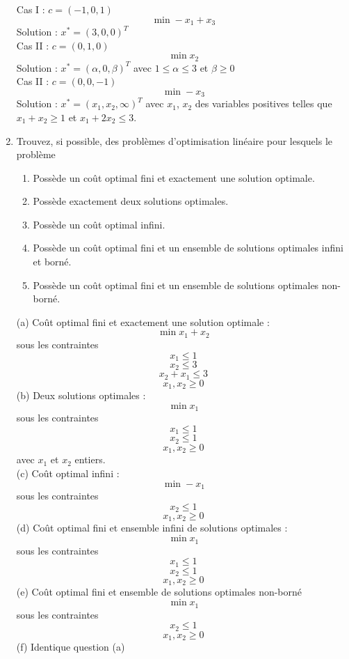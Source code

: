 \begin{enumerate}
    \begin{solution}
      Cas I : $c = (-1,0,1)$ \\
      $$ \min -x_{1} + x_{3}$$
      Solution : $x^{*} = (3,0,0)^{T}$\\
      \newline
      Cas II : $c = (0,1,0)$ \\
      $$ \min x_{2}$$
      Solution : $x^{*} = (\alpha,0,\beta)^{T}$ avec $ 1\le \alpha \le 3$ et $\beta \geq 0$\\
      \newline
      Cas II : $c = (0,0,-1)$ \\
      $$ \min -x_{3}$$
      Solution : $x^{*} = (x_{1},x_{2},\infty)^{T}$ avec $x_{1}$, $x_{2}$ des variables positives telles que $x_{1} + x_{2} \geq 1$ et $x_{1} + 2x_{2} \le 3$. 

    \end{solution}


  \item  Trouvez, si possible, des problèmes d'optimisation linéaire pour lesquels le problème

    \begin{enumerate}
      \item Poss\`ede un co\^ut optimal fini et exactement une solution optimale.
      \item Poss\`ede exactement deux solutions optimales.
      \item Possède un coût optimal infini.
      \item Possède un coût optimal fini et un ensemble de solutions optimales infini et borné.
      \item Possède un coût optimal fini et un ensemble de solutions  optimales non-borné.

    \end{enumerate}

    \begin{solution}
      (a) Coût optimal fini et exactement une solution optimale : 
      $$ \min x_{1} + x_{2}$$
      sous les contraintes 
      $$ x_{1} \le 1$$
      $$ x_{2} \le 3$$
      $$ x_{2} + x_{1} \le 3 $$
      $$ x_{1}, x_{2} \geq 0$$
      (b) Deux solutions optimales : 
      $$ \min x_{1}$$
      sous les contraintes
      $$ x_{1} \le 1$$
      $$ x_{2} \le 1$$
      $$ x_{1}, x_{2} \geq 0$$
      avec $x_{1}$ et $x_{2}$ entiers. \\
      \newline
      (c) Coût optimal infini : 
      $$ \min -x_{1} $$ 
      sous les contraintes
      $$ x_{2} \le 1 $$ 
      $$ x_{1}, x_{2} \geq 0$$
      (d) Coût optimal fini et ensemble infini de solutions optimales : 
      $$ \min x_{1}$$
      sous les contraintes
      $$ x_{1} \le 1$$
      $$ x_{2} \le 1$$
      $$ x_{1}, x_{2} \geq 0$$
      (e) Coût optimal fini et ensemble de solutions optimales non-borné
      $$ \min x_{1} $$ 
      sous les contraintes
      $$ x_{2} \le 1 $$ 
      $$ x_{1}, x_{2} \geq 0$$
      (f) Identique question (a)


\end{solution}
\end{enumerate}

